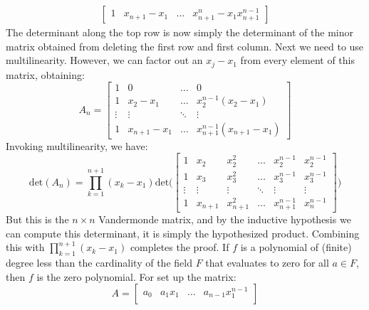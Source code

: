 \documentclass{article}                                                        %
\begin{document}
\begin{solution}
\begin{align}
\begin{bmatrix}
                1&x_{n+1}-x_{1}&\dots&x_{n+1}^{n}-x_{1}x_{n+1}^{n-1}
            \end{bmatrix}
        \end{align}
        The determinant along the top row is now simply the determinant of the
        minor matrix obtained from deleting the first row and first column.
        Next we need to use multilinearity. However, we can factor out an
        $x_{j}-x_{1}$ from every element of this matrix, obtaining:
        \begin{equation}
            A_{n}=
            \begin{bmatrix}
                1&0&\dots&0\\
                1&x_{2}-x_{1}&\dots&x_{2}^{n-1}(x_{2}-x_{1})\\
                \vdots&\vdots&\ddots&\vdots\\
                1&x_{n+1}-x_{1}&\dots&x_{n+1}^{n-1}(x_{n+1}-x_{1})
            \end{bmatrix}
        \end{equation}
        Invoking multilinearity, we have:
        \begin{equation}
            \textrm{det}(A_{n})=
            \prod_{k=1}^{n+1}(x_{k}-x_{1})
            \textrm{det}\Bigg(
                \begin{bmatrix}
                    1&x_{2}&x_{2}^{2}&\dots&x_{2}^{n-1}&x_{2}^{n-1}\\
                    1&x_{3}&x_{3}^{2}&\dots&x_{3}^{n-1}&x_{3}^{n-1}\\
                    \vdots&\vdots&\vdots&\ddots&\vdots&\vdots\\
                    1&x_{n+1}&x_{n+1}^{2}&\dots&x_{n+1}^{n-1}&x_{n}^{n-1}
                \end{bmatrix}
            \Bigg)
        \end{equation}
        But this is the $n\times{n}$ Vandermonde matrix, and by the inductive
        hypothesis we can compute this determinant, it is simply the
        hypothesized product. Combining this with
        $\prod_{k=1}^{n+1}(x_{k}-x_{1})$ completes the proof. If $f$ is a
        polynomial of (finite) degree less than the cardinality of the field $F$
        that evaluates to zero for all $a\in{F}$, then $f$ is the zero
        polynomial. For set up the matrix:
        \begin{equation}
            A=
            \begin{bmatrix}
                a_{0}&a_{1}x_{1}&\dots&a_{n-1}x_{1}^{n-1}\\

\end{bmatrix}
\end{equation}
\end{solution}
\end{document}
